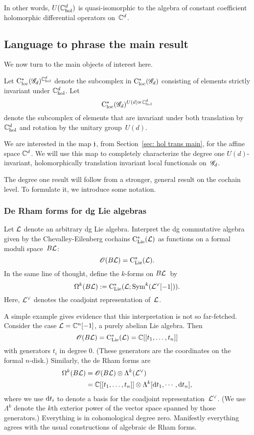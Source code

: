 In other words, $U(\mathbb C^{d}_{\rm hol})$ is quasi-isomorphic to the algebra of constant coefficient holomorphic differential operators on~$\mathbb C^d$. 

\subsection{Language to phrase the main result}

We now turn to the main objects of interest here.

\begin{dfn}
Let ${\rm C}_{\rm loc}^*(\mathscr G_d)^{\mathbb C^d_{\rm hol}}$ denote the subcomplex in ${\rm C}_{\rm loc}^*(\mathscr G_d)$ consisting of elements strictly invariant under $\mathbb C^d_{\rm hol}$.
Let
\[
{\rm C}_{\rm loc}^*(\mathscr G_d)^{U(d) \ltimes \mathbb C^d_{\rm hol}}
\]
denote the subcomplex of elements that are invariant under both translation by $\mathbb C^d_{\rm hol}$ and rotation by the unitary group~$U(d)$.
\end{dfn}

We are interested in the map $\mathfrak j$, from Section~\ref{sec: hol trans main}, for the affine space $\mathbb C^d$.
We will use this map to completely characterize the degree one $U(d)$-invariant, holomorphically translation invariant local functionals on~$\mathscr G_d$. 

The degree one result will follow from a stronger, general result on the cochain level.
To formulate it, we introduce some notation.

\subsubsection{De Rham forms for dg Lie algebras}

Let $\mathcal L$ denote an arbitrary dg Lie algebra. 
Interpret the dg commutative algebra given by the Chevalley-Eilenberg cochains ${\rm C}_{{\rm Lie}}^*(\mathcal L)$ as functions on a formal moduli space~$B \mathcal L$:
\[
\mathscr O(B \mathcal L) = {\rm C}_{{\rm Lie}}^*(\mathcal L) .
\]
In the same line of thought, define the $k$-forms on $B\mathcal L$~by
\[
\Omega^k(B \mathcal L) := {\rm C}_{{\rm Lie}}^*(\mathcal L ; {\rm Sym}^k(\mathcal L^\vee [-1])) .
\]
Here, $\mathcal L^\vee$ denotes the coadjoint representation of~$\mathcal L$. 

\begin{eg}
A simple example gives evidence that this interpretation is not so far-fetched.
Consider the case $\mathcal L = \mathbb C^n [-1]$, a purely abelian Lie algebra.
Then
\[
\mathscr O(B \mathcal L) = {\rm C}_{{\rm Lie}}^*(\mathcal L) = \mathbb C[[t_1,\ldots,t_n]]
\]
with generators $t_i$ in degree 0.
(These generators are the coordinates on the formal $n$-disk.)
Similarly, the de Rham forms are
\begin{align*}
\Omega^k(B \mathcal L) 
&= \mathscr O(B \mathcal L)  \otimes \Lambda^k(\mathcal L^\vee) \\
 &=\mathbb C[[t_1,\ldots, t_n]] \otimes \Lambda^k[{\rm d} t_1, \cdots, {\rm d} t_n],
\end{align*}
where we use ${\rm d} t_i$ to denote a basis for the coadjoint representation~$\mathcal L^\vee$.
(We use $\Lambda^k$ denote the $k$th exterior power of the vector space spanned by those generators.)
Everything is in cohomological degree zero.
Manifestly everything agrees with the usual constructions of algebraic de Rham forms.
\end{eg}


